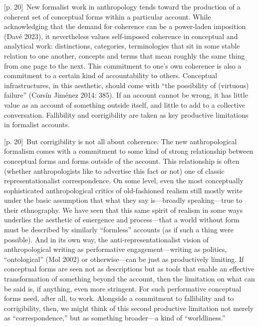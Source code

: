 \documentclass[10pt,a4paper]{article}
\begin{document}
{\scriptsize\color{gray} [p. 20]}\ New formalist work in anthropology tends toward the production of a coherent set of conceptual forms within a particular account. While acknowledging that the demand for coherence can be a power-laden imposition (Davé 2023), it nevertheless values self-imposed coherence in conceptual and analytical work: distinctions, categories, terminologies that sit in some stable relation to one another, concepts and terms that mean roughly the same thing from one page to the next. This commitment to one’s own coherence is also a commitment to a certain kind of accountability to others. Conceptual infrastructures, in this aesthetic, should come with “the possibility of (virtuous) failure” (Corsín Jiménez 2014: 385). If an account cannot be wrong, it has little value as an account of something outside itself, and little to add to a collective conversation. Fallibility and corrigibility are taken as key productive limitations in formalist accounts.\par
{\scriptsize\color{gray} [p. 20]}\ But corrigibility is not all about coherence. The new anthropological formalism comes with a commitment to some kind of strong relationship between conceptual forms and forms outside of the account. This relationship is often (whether anthropologists like to advertise this fact or not) one of classic representationalist correspondence. On some level, even the most conceptually sophisticated anthropological critics of old-fashioned realism still mostly write under the basic assumption that what they say is—broadly speaking—true to their ethnography. We have seen that this same spirit of realism in some ways underlies the aesthetic of emergence and process—that a world without form must be described by similarly “formless” accounts (as if such a thing were possible). And in its own way, the anti-representationalist vision of anthropological writing as performative engagement—writing as politics, “ontological” (Mol 2002) or otherwise—can be just as productively limiting. If conceptual forms are seen not as descriptions but as tools that enable an effective transformation of something beyond the account, then the limitation on what can be said is, if anything, even more stringent. For such performative conceptual forms need, after all, to work. Alongside a commitment to fallibility and to corrigibility, then, we might think of this second productive limitation not merely as “correspondence,” but as something broader—a kind of “worldliness.”\par
\end{document}
